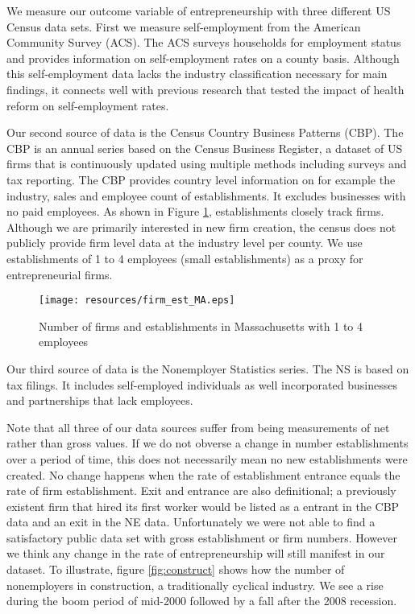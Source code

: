\documentclass[12pt]{article}
\begin{document}
We measure our outcome variable of entrepreneurship with three different US Census data sets. First we measure self-employment from the American Community Survey (ACS). The ACS surveys households for employment status and provides information on self-employment rates on a county basis. Although this self-employment data lacks the industry classification necessary for main findings, it connects well with previous research that tested the impact of health reform on self-employment rates. 

Our second source of data is the Census Country Business Patterns (CBP). The CBP is an annual series based on the Census Business Register, a dataset of US firms that is continuously updated using multiple methods including surveys and tax reporting. The CBP provides country level information on for example the industry, sales and employee count of establishments. It excludes businesses with no paid employees. As shown in Figure \ref{fig:firm_est}, establishments closely track firms. Although we are primarily interested in new firm creation, the census does not publicly provide firm level data at the industry level per county. We use establishments of 1 to 4 employees (small establishments) as a proxy for entrepreneurial firms. 

\begin{figure}[H]
	\centering
	\texttt{[image: resources/firm\_est\_MA.eps]}
	\caption{Number of firms and establishments in Massachusetts with 1 to 4 employees}
	\label{fig:firm_est}
\end{figure}

Our third source of data is the Nonemployer Statistics series. The NS is based on tax filings. It includes self-employed individuals as well incorporated businesses and partnerships that lack employees. 

Note that all three of our data sources suffer from being measurements of net rather than gross values. If  we do not obverse a change in number establishments over a period of time, this does not necessarily mean no new establishments were created. No change happens when the rate of establishment entrance equals the rate of firm establishment. Exit and entrance are also definitional; a previously existent firm that hired its first worker would be listed as a entrant in the CBP data and an exit in the NE data. Unfortunately we were not able to find a satisfactory public data set with gross establishment or firm numbers. However we think any change in the rate of entrepreneurship will still manifest in our dataset. To illustrate, figure \ref{fig:construct} shows how the number of nonemployers in construction, a traditionally cyclical industry. We see a rise during the boom period of mid-2000 followed by a fall after the 2008 recession. 
\end{document}
